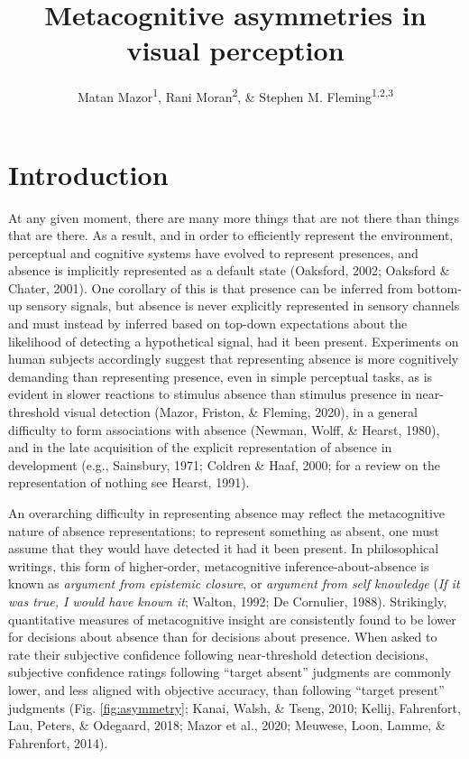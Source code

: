 \documentclass[
  english,
  man,floatsintext]{apa6}
\author{Matan Mazor\textsuperscript{1}, Rani Moran\textsuperscript{2}, \& Stephen M. Fleming\textsuperscript{1,2,3}}
\affiliation{
\vspace{0.5cm}
\textsuperscript{1} Wellcome Centre for Human Neuroimaging, UCL\\\textsuperscript{2} Max Planck UCL Centre for Computational Psychiatry and Ageing Research\\\textsuperscript{3} Department of Experimental Psychology, UCL}
\title{Metacognitive asymmetries in visual perception}
\date{}
\begin{document}
\maketitle

\hypertarget{introduction}{%
\section{Introduction}\label{introduction}}

At any given moment, there are many more things that are not there than things that are there. As a result, and in order to efficiently represent the environment, perceptual and cognitive systems have evolved to represent presences, and absence is implicitly represented as a default state (Oaksford, 2002; Oaksford \& Chater, 2001). One corollary of this is that presence can be inferred from bottom-up sensory signals, but absence is never explicitly represented in sensory channels and must instead by inferred based on top-down expectations about the likelihood of detecting a hypothetical signal, had it been present. Experiments on human subjects accordingly suggest that representing absence is more cognitively demanding than representing presence, even in simple perceptual tasks, as is evident in slower reactions to stimulus absence than stimulus presence in near-threshold visual detection (Mazor, Friston, \& Fleming, 2020), in a general difficulty to form associations with absence (Newman, Wolff, \& Hearst, 1980), and in the late acquisition of the explicit representation of absence in development (e.g., Sainsbury, 1971; Coldren \& Haaf, 2000; for a review on the representation of nothing see Hearst, 1991).

An overarching difficulty in representing absence may reflect the metacognitive nature of absence representations; to represent something as absent, one must assume that they would have detected it had it been present. In philosophical writings, this form of higher-order, metacognitive inference-about-absence is known as \emph{argument from epistemic closure}, or \emph{argument from self knowledge} (\emph{If it was true, I would have known it}; Walton, 1992; De Cornulier, 1988). Strikingly, quantitative measures of metacognitive insight are consistently found to be lower for decisions about absence than for decisions about presence. When asked to rate their subjective confidence following near-threshold detection decisions, subjective confidence ratings following \enquote{target absent} judgments are commonly lower, and less aligned with objective accuracy, than following \enquote{target present} judgments (Fig. \ref{fig:asymmetry}; Kanai, Walsh, \& Tseng, 2010; Kellij, Fahrenfort, Lau, Peters, \& Odegaard, 2018; Mazor et al., 2020; Meuwese, Loon, Lamme, \& Fahrenfort, 2014).
\end{document}

